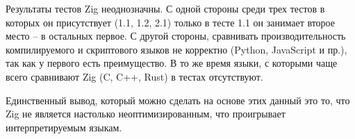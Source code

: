 Результаты тестов Zig неоднозначны. С одной стороны среди трех тестов в которых он присутствует (1.1, 1.2, 2.1) только в тесте 1.1 он занимает второе место -- в остальных первое. С другой стороны, сравнивать производительность компилируемого и скриптового языков не корректно (Python, JavaScript и пр.), так как у первого есть преимущество. В то же время языки, с которыми чаще всего сравнивают Zig (C, C++, Rust) в тестах отсутствуют.

Единственный вывод, который можно сделать на основе этих данный это то, что Zig не является настолько неоптимизированным, что проигрывает интерпретируемым языкам.